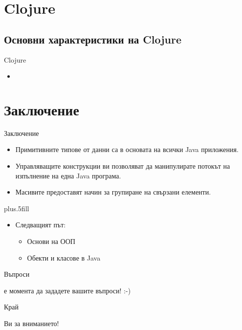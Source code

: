 \documentclass[compress,red]{beamer}
\begin{document}
\section{Clojure}
\subsection{Основни характеристики на Clojure}
\begin{frame}{Clojure}
  \transdissolve
  \begin{itemize}
  \item 
  \end{itemize}
\end{frame}


\section{Заключение}

\begin{frame}{Заключение}
  \transdissolve
  \begin{itemize}
  \item
    Примитивните типове от данни са в основата на \alert{всички} Java приложения.
  \item
    Управляващите конструкции ви позволяват да манипулирате потокът на
    изпълнение на една Java програма.
  \item
    Масивите предоставят начин за групиране на свързани елементи.
  \end{itemize}
  
  \vskip0pt plus.5fill
  \begin{itemize}
  \item
    Следващият път:
    \begin{itemize}
    \item
      Основи на ООП
    \item
      Обекти и класове в Java
    \end{itemize}
  \end{itemize}
\end{frame}


\begin{frame}{Въпроси}
  \transdissolve
  \begin{center}
     е момента да зададете вашите въпроси! :-)
  \end{center}
\end{frame}


\begin{frame}{Край}
  \transdissolve
  \begin{center}
     Ви за вниманието!
  \end{center}
  
\end{frame}
\end{document}
